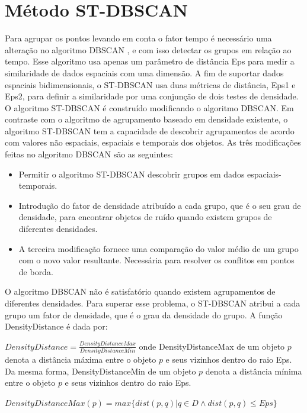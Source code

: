 \section{Método ST-DBSCAN}
\label{stdbscan}

Para agrupar os pontos levando em conta o fator tempo é necessário uma alteração no algoritmo DBSCAN \cite{ESTER1998}, e com isso detectar os grupos em relação ao tempo. Esse algoritmo usa apenas um parâmetro de distância Eps para medir a similaridade de dados espaciais com uma dimensão. A fim de suportar dados espaciais bidimensionais, o ST-DBSCAN \cite{Birant2007STDBSCANAA} usa duas métricas de distância, Eps1 e Eps2, para definir a similaridade por uma conjunção de dois testes de densidade.
O algoritmo ST-DBSCAN é construído modificando o algoritmo DBSCAN. Em contraste com o algoritmo de agrupamento baseado em densidade existente, o algoritmo ST-DBSCAN tem a capacidade de descobrir agrupamentos de acordo com valores não espaciais, espaciais e temporais dos objetos. As três modificações feitas no algoritmo DBSCAN são as seguintes:
\begin{itemize}
\item Permitir o algoritmo ST-DBSCAN descobrir grupos em dados espaciais-temporais.
\item Introdução do fator de densidade atribuído a cada grupo, que é o seu grau de densidade,
para encontrar objetos de ruído quando existem grupos de diferentes densidades.
\item A terceira modificação fornece uma comparação do valor médio de um grupo com o novo valor resultante. Necessária para resolver os conflitos em pontos de borda.
\end{itemize}

O algoritmo DBSCAN não é satisfatório quando existem agrupamentos de diferentes densidades. Para superar esse problema,  o ST-DBSCAN atribui a cada grupo um fator de densidade, que é o grau da densidade do grupo.
A função DensityDistance é dada por:

${DensityDistance = \frac{DensityDistanceMax}{DensityDistanceMin}}$
\linebreak
onde DensityDistanceMax de um objeto ${p}$ denota a distância máxima entre o objeto ${p}$ e seus vizinhos dentro do raio Eps. Da mesma forma, DensityDistanceMin de um objeto ${p}$ denota a distância mínima entre o objeto ${p}$ e seus vizinhos dentro do raio Eps.

${DensityDistanceMax(p) = max\big\{ dist(p, q) | q \in D \wedge dist(p, q)  \leqslant Eps\big\} }$

